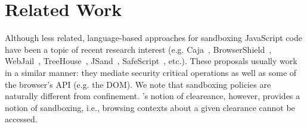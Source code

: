 \section{Related Work}
\label{sec:related}

Although less related, language-based approaches for sandboxing 
JavaScript code have been a topic of recent research interest
(e.g. Caja~\cite{GoogleCaja}, BrowserShield~\cite{Reis:2007}, WebJail~\cite{VanAcker:2011}, 
TreeHouse~\cite{Ingram:2012}, JSand~\cite{Agten:2012:JCC}, SafeScript~\cite{SafeScript}, etc.).
These proposals usually work in a similar manner: they mediate security critical
operations as well as some of the browser's API (e.g. the DOM). We note that
sandboxing policies are naturally different from confinement. \sys{}'s notion of
cleareance, however, provides a notion of sandboxing, i.e., browsing
contexts about a given clearance cannot be accessed.

 


